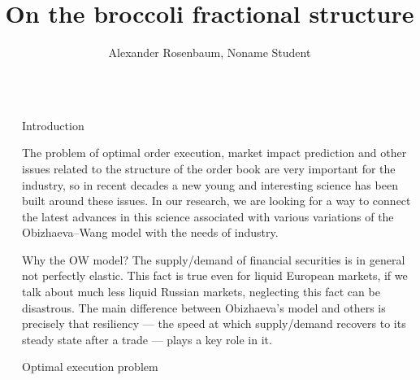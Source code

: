 \documentclass[]{beamer}
\title{On the broccoli fractional structure}
\author{Alexander Rosenbaum, Noname Student}
\begin{document}
\nocite{*} %

\begin{frame}[t]
    \begin{columns}[t] %
     
    \begin{column}{\lrmargin}\end{column} %
    
    \begin{column}{\onecolwid} %
     
    
    \begin{block}{Introduction}
    
        The problem of optimal order execution, market impact prediction and other issues related to the structure of the order book are very important for the industry, 
        so in recent decades a new young and interesting science has been built around these issues. In our research, we are looking for a way 
        to connect the latest advances in this science associated with various variations of the Obizhaeva--Wang model with the needs of industry.
    
    \end{block}

    \begin{block}{Why the OW model?}
        The supply/demand of ﬁnancial securities is in general not perfectly elastic. This fact is true even for liquid European markets, if we talk about 
        much less liquid Russian markets, neglecting this fact can be disastrous. The main difference between Obizhaeva's model and others is precisely 
        that resiliency --- the speed at which supply/demand recovers to its steady state after a trade --- plays a key role in it.
    
        
    
    \end{block}

    \begin{block}{Optimal execution problem}
    

\end{block}
\end{column}
\end{columns}
\end{frame}
\end{document}
